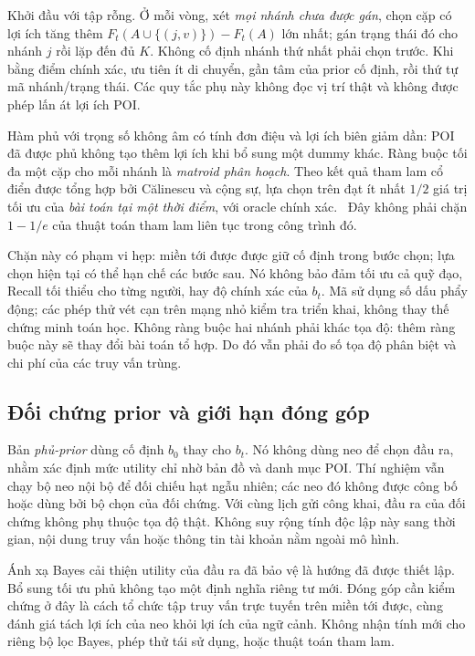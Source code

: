 Khởi đầu với tập rỗng. Ở mỗi vòng, xét \emph{mọi nhánh chưa được gán}, chọn cặp có lợi ích tăng thêm $F_t(A\cup\{(j,v)\})-F_t(A)$ lớn nhất; gán trạng thái đó cho nhánh $j$ rồi lặp đến đủ $K$. Không cố định nhánh thứ nhất phải chọn trước. Khi bằng điểm chính xác, ưu tiên ít di chuyển, gần tâm của prior cố định, rồi thứ tự mã nhánh/trạng thái. Các quy tắc phụ này không đọc vị trí thật và không được phép lấn át lợi ích POI.

Hàm phủ với trọng số không âm có tính đơn điệu và lợi ích biên giảm dần: POI đã được phủ không tạo thêm lợi ích khi bổ sung một dummy khác. Ràng buộc tối đa một cặp cho mỗi nhánh là \emph{matroid phân hoạch}. Theo kết quả tham lam cổ điển được tổng hợp bởi Călinescu và cộng sự, lựa chọn trên đạt ít nhất $1/2$ giá trị tối ưu của \emph{bài toán tại một thời điểm}, với oracle chính xác.~\citep{calinescu2011matroid} Đây không phải chặn $1-1/e$ của thuật toán tham lam liên tục trong công trình đó.

Chặn này có phạm vi hẹp: miền tới được được giữ cố định trong bước chọn; lựa chọn hiện tại có thể hạn chế các bước sau. Nó không bảo đảm tối ưu cả quỹ đạo, Recall tối thiểu cho từng người, hay độ chính xác của $b_t$. Mã sử dụng số dấu phẩy động; các phép thử vét cạn trên mạng nhỏ kiểm tra triển khai, không thay thế chứng minh toán học. Không ràng buộc hai nhánh phải khác tọa độ: thêm ràng buộc này sẽ thay đổi bài toán tổ hợp. Do đó vẫn phải đo số tọa độ phân biệt và chi phí của các truy vấn trùng.

\subsection{Đối chứng prior và giới hạn đóng góp}

Bản \emph{phủ-prior} dùng cố định $b_0$ thay cho $b_t$. Nó không dùng neo để chọn đầu ra, nhằm xác định mức utility chỉ nhờ bản đồ và danh mục POI. Thí nghiệm vẫn chạy bộ neo nội bộ để đối chiếu hạt ngẫu nhiên; các neo đó không được công bố hoặc dùng bởi bộ chọn của đối chứng. Với cùng lịch gửi công khai, đầu ra của đối chứng không phụ thuộc tọa độ thật. Không suy rộng tính độc lập này sang thời gian, nội dung truy vấn hoặc thông tin tài khoản nằm ngoài mô hình.

Ánh xạ Bayes cải thiện utility của đầu ra đã bảo vệ là hướng đã được thiết lập.~\citep{chatzikokolakis2017utility} Bổ sung tối ưu phủ không tạo một định nghĩa riêng tư mới. Đóng góp cần kiểm chứng ở đây là cách tổ chức tập truy vấn trực tuyến trên miền tới được, cùng đánh giá tách lợi ích của neo khỏi lợi ích của ngữ cảnh. Không nhận tính mới cho riêng bộ lọc Bayes, phép thử tái sử dụng, hoặc thuật toán tham lam.

